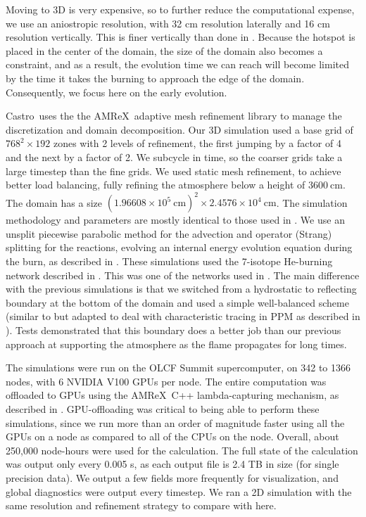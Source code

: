 \documentclass[twocolumn,linenumbers,times,tighten]{aastex631}
\newcommand{\castro}{{\sf Castro}}
\newcommand{\amrex}{{\sf AMReX}}
\begin{document}
Moving to 3D is very expensive, so to further reduce the computational
expense, we use an aniostropic resolution, with 32 cm resolution
laterally and 16 cm resolution vertically.  This is finer vertically
than done in \citet{harpole:2021}.  Because the hotspot is placed in
the center of the domain, the size of the domain also becomes a
constraint, and as a result, the evolution time we can reach will
become limited by the time it takes the burning to approach the edge
of the domain.  Consequently, we focus here on the early evolution.

\castro\ uses the the \amrex\ adaptive mesh refinement library
\citep{amrex_joss} to manage the discretization and domain
decomposition.  Our 3D simulation used a base grid of $768^2 \times
192$ zones with 2 levels of refinement, the first jumping by a factor
of 4 and the next by a factor of 2.  We subcycle in time, so the
coarser grids take a large timestep than the fine grids.  We used
static mesh refinement, to achieve better load balancing, fully
refining the atmosphere below a height of $3600~\mathrm{cm}$.  The
domain has a size $(1.96608\times 10^5~\mathrm{cm})^2 \times
2.4576\times 10^4~\mathrm{cm}$.  The simulation methodology and
parameters are mostly identical to those used in \citet{harpole:2021}.
We use an unsplit piecewise parabolic method
\citep{ppmunsplit,millercolella:2002} for the advection and operator
(Strang) splitting for the reactions, evolving an internal energy
evolution equation during the burn, as described in
\citet{strang_rnaas}.  These simulations used the 7-isotope He-burning
network described in \citet{iso7}.  This was one of the networks used
in \citet{eiden:2020}.  The main difference with the previous
simulations is that we switched from a hydrostatic to reflecting
boundary at the bottom of the domain and used a simple well-balanced
scheme (similar to \citealt{kappeli:2016} but adapted to deal with
characteristic tracing in PPM as described in \citealt{ppm-hse}).
Tests demonstrated that this boundary does a better job than our
previous approach at supporting the atmosphere as the flame propagates
for long times.

The simulations were run on the OLCF Summit supercomputer, on 342 to
1366 nodes, with 6 NVIDIA V100 GPUs per node.  The entire computation
was offloaded to GPUs using the \amrex\ C++ lambda-capturing mechanism, as described in
\citet{castro_gpu}.  GPU-offloading was critical to being able to
perform these simulations, since we run more than an order of
magnitude faster using all the GPUs on a node as compared to all of
the CPUs on the node.  Overall, about 250,000 node-hours were used for
the calculation.  The full state of the calculation was output only
every 0.005 s, as each output file is 2.4 TB in size (for single
precision data).  We output a few fields more frequently for
visualization, and global diagnostics were output every timestep.  We
ran a 2D simulation with the same resolution and refinement strategy
to compare with here.
\end{document}
